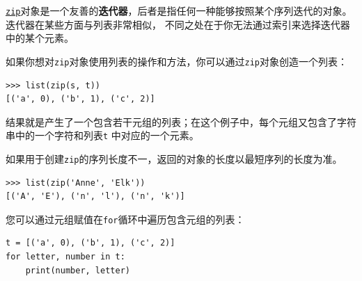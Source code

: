 %

\href{https://docs.python.org/3/library/functions.html#zip}{\lstinline{zip}}对象是一个友善的\textbf{迭代器}，后者是指任何一种能够按照某个序列迭代的对象。 迭代器在某些方面与列表非常相似， 不同之处在于你无法通过索引来选择迭代器中的某个元素。
 


如果你想对\lstinline {zip}对象使用列表的操作和方法，你可以通过\lstinline {zip}对象创造一个列表：

\begin{lstlisting}
>>> list(zip(s, t))
[('a', 0), ('b', 1), ('c', 2)]
\end{lstlisting}

%

结果就是产生了一个包含若干元组的列表；在这个例子中，每个元组又包含了字符串中的一个字符和列表\lstinline {t} 中对应的一个元素。


如果用于创建\lstinline{zip}的序列长度不一，返回的对象的长度以最短序列的长度为准。

\begin{lstlisting}
>>> list(zip('Anne', 'Elk'))
[('A', 'E'), ('n', 'l'), ('n', 'k')]
\end{lstlisting}

%

您可以通过元组赋值在\lstinline{for}循环中遍历包含元组的列表：
  

\begin{lstlisting}
t = [('a', 0), ('b', 1), ('c', 2)]
for letter, number in t:
    print(number, letter)
\end{lstlisting}

%

